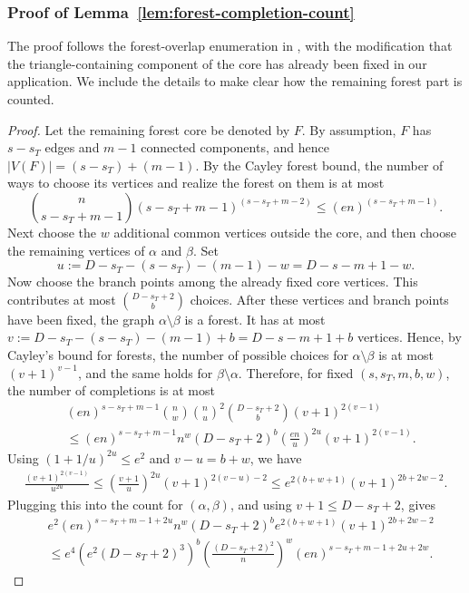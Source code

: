 \documentclass[11pt, letterpaper]{article}
\numberwithin{equation}{section}
\begin{document}
\subsubsection{Proof of Lemma~\ref{lem:forest-completion-count}}\label{app:pf-lem-forest-count-completion}
The proof follows the forest-overlap enumeration in
\cite[Proof of Theorem~2.2(b), Case~3]{sohn2025sharp}, with the modification
that the triangle-containing component of the core has already been fixed in
our application. We include the details to make clear how the remaining forest
part is counted.
\begin{proof}
Let the remaining forest core be denoted by $F$. By assumption, $F$ has $s-s_T$ edges and $m-1$ connected components, and hence $|V(F)|=(s-s_T)+(m-1)$. By the Cayley forest bound, the number of ways to choose its vertices and realize the forest on them is at most 
\[\binom{n}{s-s_T+m-1}(s-s_T+m-1)^{(s-s_T+m-2)}\leq (en)^{(s-s_T+m-1)}.\]
Next choose the $w$ additional common vertices outside the core, and then choose the remaining vertices of $\alpha$ and $\beta$. Set
\[
u := D-s_T-(s-s_T)-(m-1)-w=D-s-m+1-w.
\]
Now choose the branch points among the already fixed core vertices. This
contributes at most $\binom{D-s_T+2}{b}$ choices. After these vertices and branch
points have been fixed, the graph $\alpha\setminus\beta$ is a forest. It has at
most $v:=D-s_T-(s-s_T)-(m-1)+b=D-s-m+1+b$ vertices. Hence, by Cayley's bound for forests, the number of possible choices
for $\alpha \setminus \beta$ is at most $(v+1)^{v-1}$, and the same holds for
$\beta \setminus \alpha$. Therefore, for fixed $(s,s_T,m,b,w)$, the number of
completions is at most
\begin{align*}
    &(en)^{s-s_T+m-1}\binom{n}{w}\binom{n}{u}^2
    \binom{D-s_T+2}{b}(v+1)^{2(v-1)}\\
    &\leq
    (en)^{s-s_T+m-1} n^w (D-s_T+2)^b
    \left(\frac{en}{u}\right)^{2u}(v+1)^{2(v-1)}.
\end{align*}
Using $(1+1/u)^{2u}\le e^2$ and $v-u=b+w$, we have\begin{align*}
    \frac{(v+1)^{2(v-1)}}{u^{2u}}\leq \left(\frac{v+1}{u}\right)^{2u}(v+1)^{2(v-u)-2}
    \leq e^{2(b+w+1)}(v+1)^{2b+2w-2}.
\end{align*}
Plugging this into the count for \((\alpha,\beta)\), and using
\(v+1\le D-s_T+2\), gives
\begin{align*}
&e^2(en)^{s-s_T+m-1+2u} n^w
(D-s_T+2)^b e^{2(b+w+1)}(v+1)^{2b+2w-2} \\
&\leq
e^4
\left(e^2(D-s_T+2)^3\right)^b
\left(\frac{(D-s_T+2)^2}{n}\right)^w
(en)^{s-s_T+m-1+2u+2w}. \end{align*}\end{proof}
\vspace{-2em}
\end{document}
